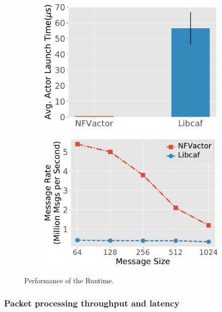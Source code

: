 \begin{figure}[!h]
\begin{subfigure}[t]{0.49\linewidth}
    \centering
    \includegraphics[width=\columnwidth]{chap-nfvactor/exp-figure/micro_launch_time.pdf}
    \caption{}\label{fig:micro_launch_time}
  \end{subfigure}\hfill
  \begin{subfigure}[t]{0.49\linewidth}
    \centering
    \includegraphics[width=\columnwidth]{chap-nfvactor/exp-figure/micro_mp.pdf}
    \caption{}\label{fig:micro_mp}
  \end{subfigure}
\caption{Performance of the Runtime.}
\label{fig:mig-perf}
\end{figure}

\subsubsection{Packet processing throughput and latency}
\label{sec:packet-processing-tl}

